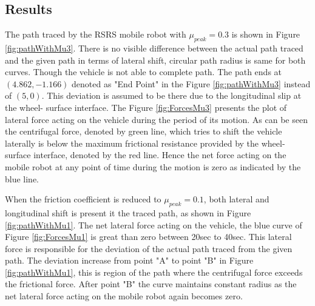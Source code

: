 {\subsection{Results}
The path traced by the RSRS mobile robot  with  $\mu_{peak} =0.3$ is shown in Figure \ref{fig:pathWithMu3}. There is no visible difference between the  actual path traced  and the given path in terms of lateral shift, circular path radius is same for both curves. Though the vehicle is not able to complete path. The path ends at ${(4.862,-1.166)}$ denoted as "End Point" in the Figure \ref{fig:pathWithMu3} instead of  ${(5,0)}$. This deviation is assumed to be there due to the longitudinal slip at the wheel- surface interface. The Figure \ref{fig:ForcesMu3} presents the plot of lateral force acting on the vehicle during the period of its motion. As can be seen the centrifugal force, denoted by green line, which tries to shift the vehicle laterally is below the maximum frictional resistance provided by the wheel-surface interface, denoted by the red line. Hence the net force acting on the mobile robot at any point of time during the motion is zero as indicated by the blue line.

When the friction coefficient is reduced to  $\mu_{peak} =0.1$, both lateral and longitudinal shift is present it the traced path, as shown in Figure \ref{fig:pathWithMu1}. The  net lateral force acting on the vehicle, the blue curve of Figure \ref{fig:ForcesMu1} is great than zero between 20sec to 40sec. This lateral force is responsible for the deviation of the actual path traced from the given path. The deviation increase from point "A" to point "B" in Figure \ref{fig:pathWithMu1}, this is region of the path where the centrifugal force exceeds the frictional force. After point "B" the curve maintains constant radius as the net lateral force acting on the mobile robot again becomes zero. 
}

